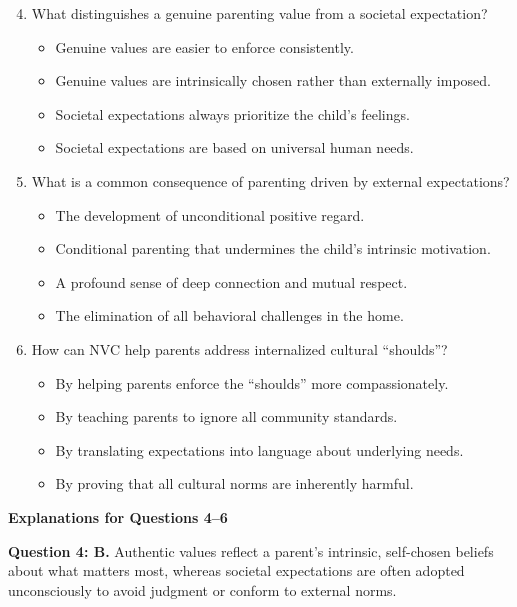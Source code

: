 \begin{practiceexercise}
\begin{enumerate}
  \setcounter{enumi}{3}
  \item What distinguishes a genuine parenting value from a societal expectation?
    \begin{itemize}
      \item[A)] Genuine values are easier to enforce consistently.
      \item[B)] Genuine values are intrinsically chosen rather than externally imposed.
      \item[C)] Societal expectations always prioritize the child's feelings.
      \item[D)] Societal expectations are based on universal human needs.
    \end{itemize}
  \vspace{\fill}
  \item What is a common consequence of parenting driven by external expectations?
    \begin{itemize}
      \item[A)] The development of unconditional positive regard.
      \item[B)] Conditional parenting that undermines the child's intrinsic motivation.
      \item[C)] A profound sense of deep connection and mutual respect.
      \item[D)] The elimination of all behavioral challenges in the home.
    \end{itemize}
  \vspace{\fill}
  \item How can NVC help parents address internalized cultural ``shoulds''?
    \begin{itemize}
      \item[A)] By helping parents enforce the ``shoulds'' more compassionately.
      \item[B)] By teaching parents to ignore all community standards.
      \item[C)] By translating expectations into language about underlying needs.
      \item[D)] By proving that all cultural norms are inherently harmful.
    \end{itemize}
\end{enumerate}
\vspace{\fill}

\newpage
\textbf{Explanations for Questions 4--6}

\textbf{Question 4: B.} Authentic values reflect a parent's intrinsic, self-chosen beliefs about what matters most, whereas societal expectations are often adopted unconsciously to avoid judgment or conform to external norms.
\vspace{\fill}


\end{practiceexercise}
